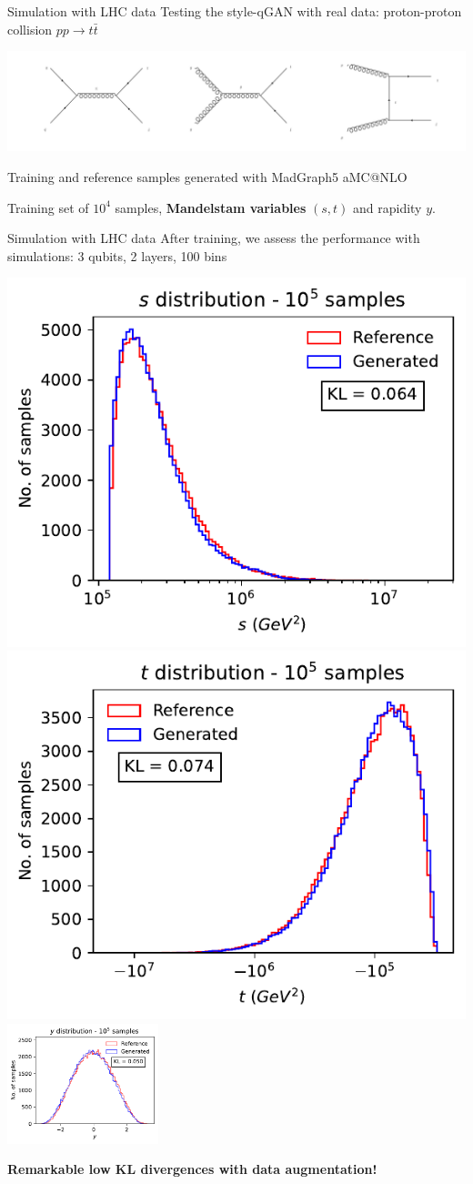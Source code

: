 \documentclass[11pt,aspectratio=169]{beamer}
\begin{document}
\begin{frame}{Simulation with LHC data}
    Testing the style-qGAN with real data: proton-proton collision $pp \rightarrow t\bar{t}$

    \vspace{1cm}
    \includegraphics[width=\textwidth]{figures/ppttbar.png}

    Training and reference samples generated with MadGraph5 aMC@NLO

    Training set of $10^4$ samples, \textbf{Mandelstam variables} $(s, t)$ and rapidity $y$.
\end{frame}

\begin{frame}{Simulation with LHC data}
    After training, we assess the performance with simulations: 3 qubits, 2 layers, 100 bins

    \begin{multicols*}{3}
        \includegraphics[width=0.33 \textwidth]{figures/plots/LHCttbar/s-distribution_LHCdata_100k.pdf}
        \includegraphics[width=0.33 \textwidth]{figures/plots/LHCttbar/t-distribution_LHCdata_100k.pdf}
        \includegraphics[width=0.33\textwidth]{figures/plots/LHCttbar/y-distribution_LHCdata_100k.pdf}
    \end{multicols*}
    \begin{center}
        {\color{red}
        \textbf{
        Remarkable low KL divergences with data augmentation!}
        }
    \end{center}
\end{frame}
\end{document}
